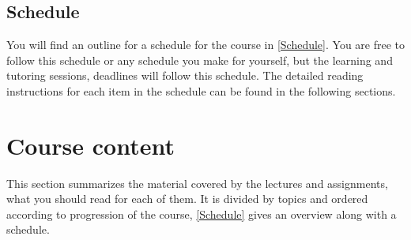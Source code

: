 \subsection{Schedule}

You will find an outline for a schedule for the course in \cref{Schedule}.
You are free to follow this schedule or any schedule you make for yourself, but 
the learning and tutoring sessions, deadlines \etc will follow this schedule.
The detailed reading instructions for each item in the schedule can be found in 
the following sections.

\begin{frame}[allowframebreaks]

\end{frame}


\section{Course content}

This section summarizes the material covered by the lectures and assignments, 
\ie what you should read for each of them.
It is divided by topics and ordered according to progression of the course, 
\cref{Schedule} gives an overview along with a schedule.



%



